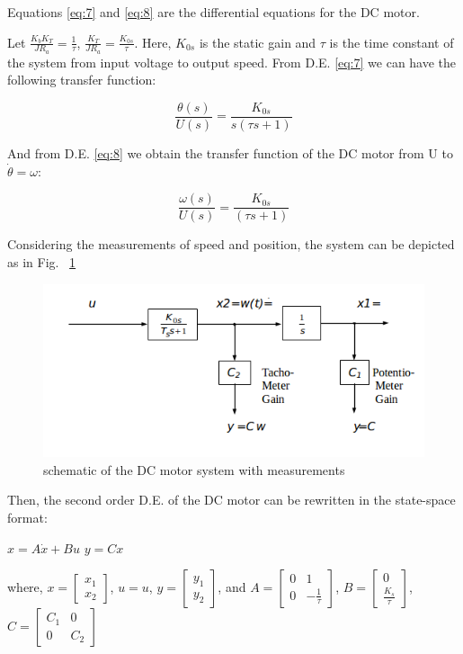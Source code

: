 \documentclass[11pt,a4paper]{article}
\begin{document}
Equations \ref{eq:7} and \ref{eq:8} are the differential equations for the DC motor.

Let $\frac{K_{b}K_{T}}{JR_{a}} = \frac{1}{\tau}$, $\frac{K_{T}}{JR_{a}} = \frac{K_{0s}}{\tau}$. Here, $K_{0s}$ is the static gain and $\tau$ is the time constant of the system from input voltage to output speed. From D.E. \ref{eq:7} we can have the following transfer function:

\begin{equation} \label{eq:9}
\frac{\theta(s)}{U(s)} = \frac{K_{0s}}{s(\tau s + 1)}
\end{equation}

And from D.E. \ref{eq:8} we obtain the transfer function of the DC motor from U to $\dot{\theta}=\omega$:

\begin{equation} \label{eq:10}
\frac{\omega (s)}{U(s)} = \frac{K_{0s}}{(\tau s + 1)}
\end{equation}

Considering the measurements of speed and position, the system can be depicted as in Fig. ~\ref{fig:servomeasschem}

\begin{figure}[here]
\includegraphics[width=\textwidth]{imglab/servomeasurementschematic.png}
\caption{schematic of the DC motor system with measurements}
\label{fig:servomeasschem}
\end{figure}

Then, the second order D.E. of the DC motor can be rewritten in the state-space format:

$x = A\dot{x} + Bu$
$y = Cx$

where, $x = \left[\begin{matrix}x_{1} \\ x_{2}\end{matrix}\right]$, $u=u$, $y = \left[\begin{matrix}y_{1} \\ y_{2}\end{matrix}\right]$, and
$A = \left[\begin{matrix}0 & 1 \\ 0 & -\frac{1}{\tau}\end{matrix}\right]$, $B=\left[\begin{matrix} 0 \\ \frac{K_{s}}{\tau} \end{matrix}\right]$, $C = \left[\begin{matrix}C_{1} & 0 \\ 0 & C_{2} \end{matrix}\right]$
\end{document}
